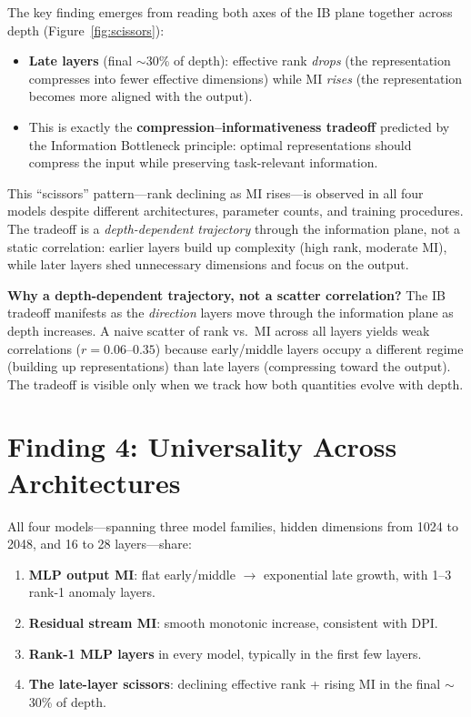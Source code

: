 \documentclass[11pt]{article}
\begin{document}
The key finding emerges from reading both axes of the IB plane together across depth (Figure~\ref{fig:scissors}):

\begin{itemize}
    \item \textbf{Late layers} (final $\sim$30\% of depth): effective rank \emph{drops} (the representation compresses into fewer effective dimensions) while MI \emph{rises} (the representation becomes more aligned with the output).
    \item This is exactly the \textbf{compression--informativeness tradeoff} predicted by the Information Bottleneck principle: optimal representations should compress the input while preserving task-relevant information.
\end{itemize}

This ``scissors'' pattern---rank declining as MI rises---is observed in all four models despite different architectures, parameter counts, and training procedures. The tradeoff is a \emph{depth-dependent trajectory} through the information plane, not a static correlation: earlier layers build up complexity (high rank, moderate MI), while later layers shed unnecessary dimensions and focus on the output.

\textbf{Why a depth-dependent trajectory, not a scatter correlation?} The IB tradeoff manifests as the \emph{direction} layers move through the information plane as depth increases. A naive scatter of rank vs.\ MI across all layers yields weak correlations ($r = 0.06$--$0.35$) because early/middle layers occupy a different regime (building up representations) than late layers (compressing toward the output). The tradeoff is visible only when we track how both quantities evolve with depth.

\section{Finding 4: Universality Across Architectures}
\label{sec:f4}

All four models---spanning three model families, hidden dimensions from 1024 to 2048, and 16 to 28 layers---share:

\begin{enumerate}
    \item \textbf{MLP output MI}: flat early/middle $\to$ exponential late growth, with 1--3 rank-1 anomaly layers.
    \item \textbf{Residual stream MI}: smooth monotonic increase, consistent with DPI.
    \item \textbf{Rank-1 MLP layers} in every model, typically in the first few layers.
    \item \textbf{The late-layer scissors}: declining effective rank + rising MI in the final $\sim$30\% of depth.
\end{enumerate}
\end{document}
